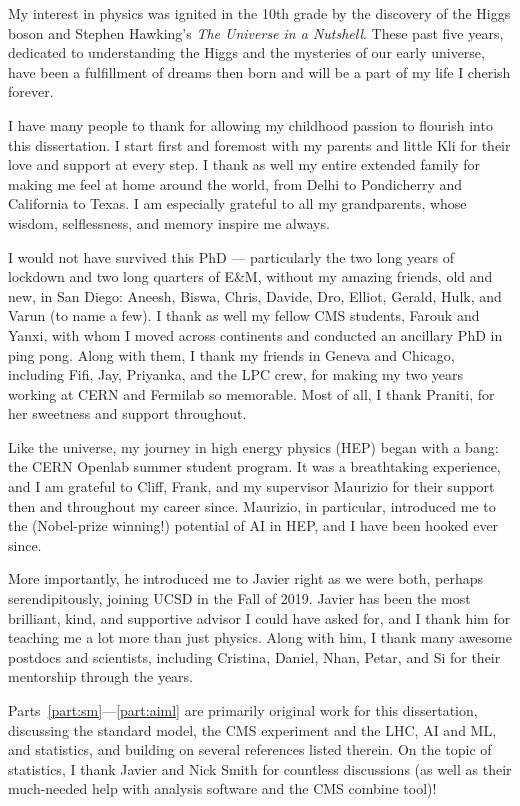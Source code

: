 My interest in physics was ignited in the 10th grade by the discovery of the Higgs boson and Stephen Hawking's \textit{The Universe in a Nutshell}. 
These past five years, dedicated to understanding the Higgs and the mysteries of our early universe, have been a fulfillment of dreams then born and will be a part of my life I cherish forever.

I have many people to thank for allowing my childhood passion to flourish into this dissertation.
I start first and foremost with my parents and little Kli for their love and support at every step.
I thank as well my entire extended family for making me feel at home around the world, from Delhi to Pondicherry and California to Texas.
I am especially grateful to all my grandparents, whose wisdom, selflessness, and memory inspire me always.

I would not have survived this PhD --- particularly the two long years of lockdown and two long quarters of E\&M, without my amazing friends, old and new, in San Diego: Aneesh, Biswa, Chris, Davide, Dro, Elliot, Gerald, Hulk, and Varun (to name a few).
I thank as well my fellow CMS students, Farouk and Yanxi, with whom I moved across continents and conducted an ancillary PhD in ping pong.
Along with them, I thank my friends in Geneva and Chicago, including Fifi, Jay, Priyanka, and the LPC crew, for making my two years working at CERN and Fermilab so memorable.
Most of all, I thank Praniti, for her sweetness and support throughout.

Like the universe, my journey in high energy physics (HEP) began with a bang: the CERN Openlab summer student program.
It was a breathtaking experience, and I am grateful to Cliff, Frank, and my supervisor Maurizio for their support then and throughout my career since.
Maurizio, in particular, introduced me to the (Nobel-prize winning!) potential of AI in HEP, and I have been hooked ever since.

More importantly, he introduced me to Javier right as we were both, perhaps serendipitously, joining UCSD in the Fall of 2019.
Javier has been the most brilliant, kind, and supportive advisor I could have asked for, and I thank him for teaching me a lot more than just physics.
Along with him, I thank many awesome postdocs and scientists, including Cristina, Daniel, Nhan, Petar, and Si for their mentorship through the years.

Parts~\ref{part:sm}---\ref{part:aiml} are primarily original work for this dissertation, discussing the standard model, the CMS experiment and the LHC, AI and ML, and statistics, and building on several references listed therein.
On the topic of statistics, I thank Javier and Nick Smith for countless discussions (as well as their much-needed help with analysis software and the CMS combine tool)!

